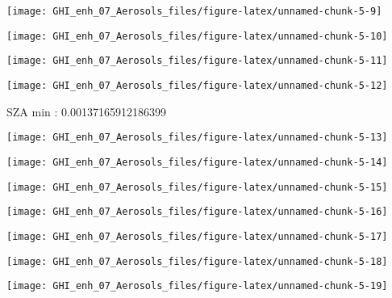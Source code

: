 \documentclass[
  10pt,
  a4paper,oneside]{article}
\begin{document}
\begin{center}\texttt{[image: GHI\_enh\_07\_Aerosols\_files/figure-latex/unnamed-chunk-5-9]} \end{center}

\begin{center}\texttt{[image: GHI\_enh\_07\_Aerosols\_files/figure-latex/unnamed-chunk-5-10]} \end{center}

\begin{center}\texttt{[image: GHI\_enh\_07\_Aerosols\_files/figure-latex/unnamed-chunk-5-11]} \end{center}

\begin{center}\texttt{[image: GHI\_enh\_07\_Aerosols\_files/figure-latex/unnamed-chunk-5-12]} \end{center}

SZA min : 0.00137165912186399

\begin{center}\texttt{[image: GHI\_enh\_07\_Aerosols\_files/figure-latex/unnamed-chunk-5-13]} \end{center}

\begin{center}\texttt{[image: GHI\_enh\_07\_Aerosols\_files/figure-latex/unnamed-chunk-5-14]} \end{center}

\begin{center}\texttt{[image: GHI\_enh\_07\_Aerosols\_files/figure-latex/unnamed-chunk-5-15]} \end{center}

\begin{center}\texttt{[image: GHI\_enh\_07\_Aerosols\_files/figure-latex/unnamed-chunk-5-16]} \end{center}

\begin{center}\texttt{[image: GHI\_enh\_07\_Aerosols\_files/figure-latex/unnamed-chunk-5-17]} \end{center}

\begin{center}\texttt{[image: GHI\_enh\_07\_Aerosols\_files/figure-latex/unnamed-chunk-5-18]} \end{center}

\begin{center}\texttt{[image: GHI\_enh\_07\_Aerosols\_files/figure-latex/unnamed-chunk-5-19]} \end{center}
\end{document}
